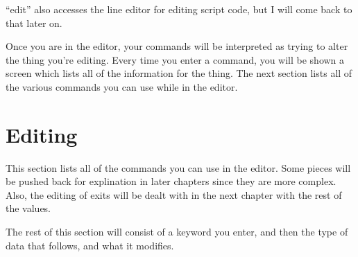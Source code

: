 ``edit'' also accesses the line editor for editing script code, but I
will come back to that later on.

Once you are in the editor, your commands will be interpreted as trying
to alter the thing you're editing. Every time you enter a command, you
will be shown a screen which lists all of the information for the thing.
The next section lists all of the various commands you can use while
in the editor.

\section{Editing}

This section lists all of the commands you can use in the editor.
Some pieces will be pushed back for explination in later chapters
since they are more complex. Also, the editing of exits will be dealt
with in the next chapter with the rest of the values.

The rest of this section will consist of a keyword you enter, and then the type of data that follows, and what it modifies.


